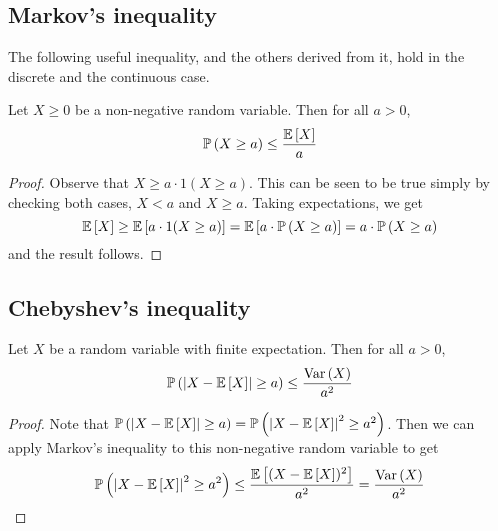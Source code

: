 \subsection{Markov's inequality}
The following useful inequality, and the others derived from it, hold in the discrete and the continuous case.
\begin{theorem}
	Let \(X \geq 0\) be a non-negative random variable.
	Then for all \(a > 0\),
	\[
		\mathbb{P}\left({X \geq a}\right) \leq \frac{\mathbb{E}\left[{X}\right]}{a}
	\]
\end{theorem}
\begin{proof}
	Observe that \(X \geq a \cdot 1(X \geq a)\).
	This can be seen to be true simply by checking both cases, \(X < a\) and \(X \geq a\).
	Taking expectations, we get
	\[
		\mathbb{E}\left[{X}\right] \geq \mathbb{E}\left[{a \cdot 1(X \geq a)}\right] = \mathbb{E}\left[{a \cdot \mathbb{P}\left({X \geq a}\right)}\right] = a \cdot \mathbb{P}\left({X \geq a}\right)
	\]
	and the result follows.
\end{proof}

\subsection{Chebyshev's inequality}
\begin{theorem}
	Let \(X\) be a random variable with finite expectation.
	Then for all \(a > 0\),
	\[
		\mathbb{P}\left({\abs{X - \mathbb{E}\left[{X}\right]} \geq a}\right) \leq \frac{\operatorname{Var}\left({X}\right)}{a^2}
	\]
\end{theorem}
\begin{proof}
	Note that \(\mathbb{P}\left({\abs{X - \mathbb{E}\left[{X}\right]} \geq a}\right) = \mathbb{P}\left({\abs{X - \mathbb{E}\left[{X}\right]}^2 \geq a^2}\right)\).
	Then we can apply Markov's inequality to this non-negative random variable to get
	\[
		\mathbb{P}\left({\abs{X - \mathbb{E}\left[{X}\right]}^2 \geq a^2}\right) \leq \frac{\mathbb{E}\left[{(X - \mathbb{E}\left[{X}\right])^2}\right]}{a^2} = \frac{\operatorname{Var}\left({X}\right)}{a^2}
	\]
\end{proof}

